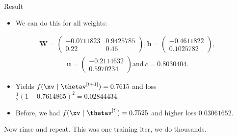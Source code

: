 \documentclass[11pt,compress,t,notes=noshow, xcolor=table]{beamer}
\begin{document}
\begin{vbframe}{Result}
  \begin{itemize}
    \item We can do this for all weights:
  \end{itemize}
  \begin{eqnarray*}
    \textbf{W} = \begin{pmatrix}
    \num[round-mode=places,round-precision=4]{-0.0711823} & \num[round-mode=places,round-precision=4]{0.9425785} \\
    0.22 & 0.46
    \end{pmatrix},
    \textbf{b} = \begin{pmatrix}
    \num[round-mode=places,round-precision=4]{-0.4611822} \\
    \num[round-mode=places,round-precision=4]{0.1025782}
    \end{pmatrix},
  \end{eqnarray*}
  \begin{eqnarray*}
    \textbf{u} = \begin{pmatrix}
    \num[round-mode=places,round-precision=4]{-0.2114632} \\
    \num[round-mode=places,round-precision=4]{0.5970234}
    \end{pmatrix}
    \text{and} \ c = \num[round-mode=places,round-precision=4]{0.8030404}\text{.}
  \end{eqnarray*}

  \begin{itemize}
    \item Yields $f(\xv ~|~\thetav^{[t+1]}) = \num[round-mode=places,round-precision=4]{0.7614865}$ and loss 
        $\frac{1}{2}(1 - \num[round-mode=places,round-precision=4]{0.7614865})^2 = \num[round-mode=places,round-precision=4]{0.02844434}.$
    \item Before, we had $f(\xv ~|~\thetav^{[t]}) = \num[round-mode=places,round-precision=4]{0.7525469}$ and higher loss $\num[round-mode=places,round-precision=4]{0.03061652}$.

  \end{itemize}
\lz
 Now rinse and repeat. This was one training iter, we do thousands.
\end{vbframe}
\end{document}
